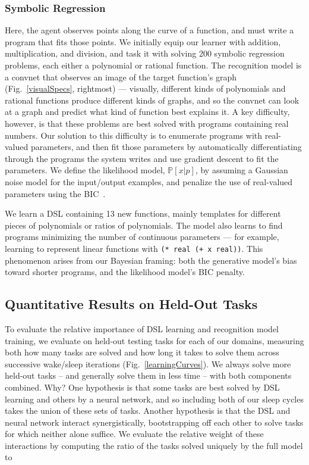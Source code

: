 \documentclass{article}
\newcommand{\code}[1]{{\footnotesize\texttt{#1}}}
\newcommand{\probability}{\mathds{P}} %
\begin{document}
\subsubsection{Symbolic Regression}\label{regressionSection}
Here, the agent observes points along the curve of a function, and
must write a program that fits those points.  We initially equip our
learner with addition, multiplication, and division, and task it with
solving 200 symbolic regression problems, each either a polynomial or
rational function.  The recognition model is a convnet that observes
an image of the target function's graph (Fig.~\ref{visualSpecs},
rightmost) --- visually, different kinds of polynomials and rational
functions produce different kinds of graphs, and so the convnet can
look at a graph and predict what kind of function best explains it.  A
key difficulty, however, is that these problems are best solved with
programs containing real numbers.  Our solution to this difficulty is
to enumerate programs with real-valued parameters, and then fit those
parameters by automatically differentiating through the programs the
system writes and use gradient descent to fit the parameters.  We
define the likelihood model, $\probability[x|p]$, by assuming a
Gaussian noise model for the input/output examples, and penalize the
use of real-valued parameters using the
BIC~\cite{Bishop:2006:PRM:1162264}.

We learn a DSL containing 13 new functions, mainly templates for
different pieces of polynomials or ratios of polynomials.  The model
also learns to find programs minimizing the number of continuous
parameters --- for example, learning to represent linear functions
with \code{(* real (+ x real))}.  This phenomenon arises from our
Bayesian framing: both the generative model's bias toward shorter
programs, and the likelihood model's BIC penalty.


\subsection{Quantitative Results on Held-Out Tasks}\label{quantitative}
To evaluate the relative importance of DSL learning and recognition
model training, we evaluate on held-out testing tasks for each of our
domains, measuring both how many tasks are solved and how long it
takes to solve them across successive wake/sleep iterations
(Fig.~\ref{learningCurves}).  We always solve more held-out tasks --
and generally solve them in less time -- with both components
combined.  Why?  One hypothesis is that some tasks are best solved by
DSL learning and others by a neural network, and so including both of
our sleep cycles  takes the union of these sets of tasks.  Another
hypothesis is that the DSL and neural network interact
synergistically, bootstrapping off each other to solve tasks for which
neither alone suffice. We evaluate the relative weight of these interactions by
computing the ratio of the tasks solved uniquely by the full model to 
\end{document}
